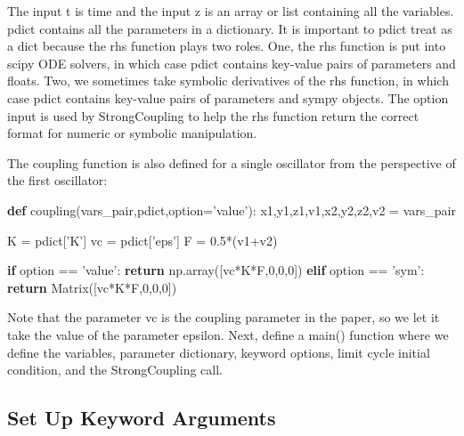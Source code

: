 \documentclass[english,a4paper,oneside]{article}
\newenvironment{Shaded}{}{}
\newcommand{\KeywordTok}[1]{\textcolor[rgb]{0.00,0.44,0.13}{\textbf{#1}}}
\newcommand{\DecValTok}[1]{\textcolor[rgb]{0.25,0.63,0.44}{#1}}
\newcommand{\FloatTok}[1]{\textcolor[rgb]{0.25,0.63,0.44}{#1}}
\newcommand{\StringTok}[1]{\textcolor[rgb]{0.25,0.44,0.63}{#1}}
\newcommand{\ControlFlowTok}[1]{\textcolor[rgb]{0.00,0.44,0.13}{\textbf{#1}}}
\newcommand{\OperatorTok}[1]{\textcolor[rgb]{0.40,0.40,0.40}{#1}}
\newcommand{\NormalTok}[1]{#1}
\begin{document}
The input t is time and the input z is an array or list containing all
the variables. pdict contains all the parameters in a dictionary. It is
important to pdict treat as a dict because the rhs function plays two
roles. One, the rhs function is put into scipy ODE solvers, in which
case pdict contains key-value pairs of parameters and floats. Two, we
sometimes take symbolic derivatives of the rhs function, in which case
pdict contains key-value pairs of parameters and sympy objects. The
option input is used by StrongCoupling to help the rhs function return
the correct format for numeric or symbolic manipulation.

The coupling function is also defined for a single oscillator from the
perspective of the first oscillator:

\begin{Shaded}
\begin{Highlighting}[]
\KeywordTok{def}\NormalTok{ coupling(vars_pair,pdict,option}\OperatorTok{=}\StringTok{'value'}\NormalTok{):}
\NormalTok{    x1,y1,z1,v1,x2,y2,z2,v2 }\OperatorTok{=}\NormalTok{ vars_pair}
    
\NormalTok{    K }\OperatorTok{=}\NormalTok{ pdict[}\StringTok{'K'}\NormalTok{]}
\NormalTok{    vc }\OperatorTok{=}\NormalTok{ pdict[}\StringTok{'eps'}\NormalTok{]}
\NormalTok{    F }\OperatorTok{=} \FloatTok{0.5}\OperatorTok{*}\NormalTok{(v1}\OperatorTok{+}\NormalTok{v2)}
    
    \ControlFlowTok{if}\NormalTok{ option }\OperatorTok{==} \StringTok{'value'}\NormalTok{:}
        \ControlFlowTok{return}\NormalTok{ np.array([vc}\OperatorTok{*}\NormalTok{K}\OperatorTok{*}\NormalTok{F,}\DecValTok{0}\NormalTok{,}\DecValTok{0}\NormalTok{,}\DecValTok{0}\NormalTok{])}
    \ControlFlowTok{elif}\NormalTok{ option }\OperatorTok{==} \StringTok{'sym'}\NormalTok{:}
        \ControlFlowTok{return}\NormalTok{ Matrix([vc}\OperatorTok{*}\NormalTok{K}\OperatorTok{*}\NormalTok{F,}\DecValTok{0}\NormalTok{,}\DecValTok{0}\NormalTok{,}\DecValTok{0}\NormalTok{])}
\end{Highlighting}
\end{Shaded}

Note that the parameter vc is the coupling parameter in the paper, so we
let it take the value of the parameter epsilon. Next, define a main()
function where we define the variables, parameter dictionary, keyword
options, limit cycle initial condition, and the StrongCoupling call.

\subsection{Set Up Keyword Arguments}\label{set-up-keyword-arguments}
\end{document}
